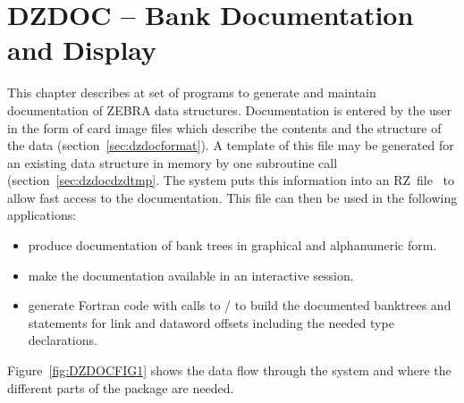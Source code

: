  
\chapter{DZDOC -- Bank Documentation and Display}
\label{sec:dzdocdescription}
 
This chapter describes at set of programs
to generate and maintain documentation of ZEBRA data structures.
Documentation is entered by the user in the form of card image files which
describe the contents and the structure of the data (section~\ref{sec:dzdocformat}).
A template of this file may be generated for an existing data structure
in memory by one subroutine call (section~\ref{sec:dzdocdzdtmp}.
The system puts this information into an RZ~file~\cite{bib-ZEBRARZ}
to allow fast access to the documentation. 
This file can then be used in the following applications:
 
\begin{itemize}
\item produce documentation of bank trees in graphical and alphanumeric
      form.
\item make the documentation available in an interactive session.
\item generate Fortran code with calls to /
      to build the documented banktrees and  statements 
      for link and dataword offsets including the needed type declarations.
\end{itemize}
 
Figure~\ref{fig:DZDOCFIG1} shows the data flow through the 
system and where the different parts of the package are needed.
 
